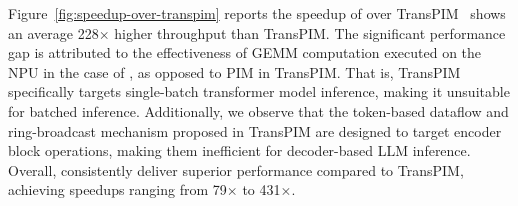 %
Figure~\ref{fig:speedup-over-transpim} reports the speedup of \neupims over TransPIM~\cite{hpca22-transpim}
%
\neupims shows an average 228$\times$ higher throughput than TransPIM.
%
The significant performance gap is attributed to the effectiveness of GEMM computation executed on the NPU in the case of \neupims, as opposed to PIM in TransPIM.
%
That is, TransPIM specifically targets single-batch transformer model inference, making it unsuitable for batched inference. 
%
Additionally, we observe that the token-based dataflow and ring-broadcast mechanism proposed in TransPIM are designed to target encoder block operations, making them inefficient for decoder-based LLM inference.
%
Overall, \neupims consistently deliver superior performance compared to TransPIM, achieving speedups ranging from 79$\times$ to 431$\times$.
%